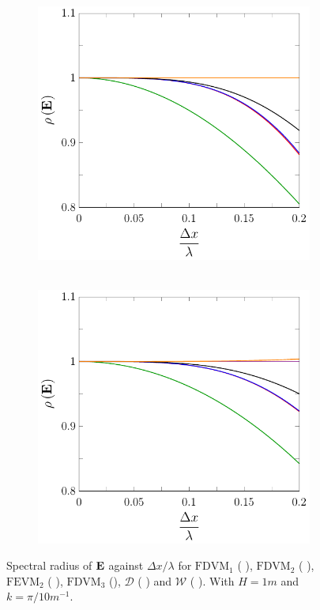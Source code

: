 \begin{figure}
	\centering
	\begin{subfigure}{0.5\textwidth}
		\includegraphics[width=\textwidth]{./chp4/figures/New/Stabu0.pdf}\
	\end{subfigure}%
	\begin{subfigure}{0.5\textwidth}
		\includegraphics[width=\textwidth]{./chp4/figures/New/Stabu1.pdf}
	\end{subfigure}
	\caption{Spectral radius of $\mathbf{E}$ against $\Delta x / \lambda$ for $\text{FDVM}_1$ ({\color{green!60!black} \solidrule}), $\text{FDVM}_2$ ({\color{red} \solidrule}), $\text{FEVM}_2$ ({\color{blue} \solidrule}), $\text{FDVM}_3$ ({\solidrule}), $\mathcal{D}$ ({\color{violet!80!white} \solidrule}) and $\mathcal{W}$ ({\color{orange} \solidrule}). With $H = 1m$ and $k = {\pi}/{10}m^{-1}$.}
	\label{fig:StabShall}
\end{figure}

